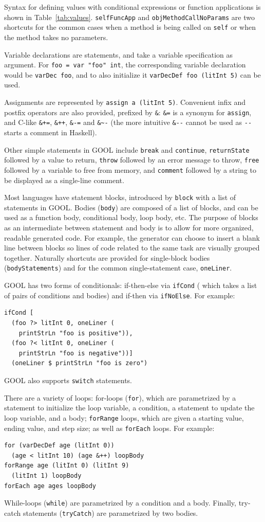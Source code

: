 \documentclass[sigplan,review,anonymous,prologue,dvipsnames]{acmart}
\begin{document}
Syntax for defining values with conditional expressions or function
applications is shown in Table~\ref{tab:values}. \verb|selfFuncApp| and
\verb|objMethodCallNoParams| are two shortcuts for the common cases when a
method is being called on \verb|self| or when the method takes no parameters.

Variable declarations are statements, and take a variable specification
as argument. For \verb|foo = var "foo" int|, the corresponding variable
declaration would be \verb|varDec foo|, and to also initialize it
\verb|varDecDef foo (litInt 5)| can be used.

Assignments are represented by \verb|assign a (litInt 5)|. Convenient
infix and postfix operators are also provided, prefixed by \verb|&|:
\verb|&=| is a synonym for \verb|assign|, and C-like
\verb|&+=|, \verb|&++|, \verb|&-=| and \verb|&~-| (the more intuitive
\verb|&--| cannot be used as \verb|--| starts a comment in Haskell).

Other simple statements in GOOL include \verb|break| and \verb|continue|,
\verb|returnState| followed by a value to return, \verb|throw| followed by an
error message to throw, \verb|free| followed by a variable to free from
memory, and \verb|comment| followed by a string to be displayed as a
single-line comment.

Most languages have statement blocks, introduced by \verb|block| with
a list of statements in GOOL. Bodies (\verb|body|) are composed
of a list of blocks, and can be used as a function body, conditional body, loop
body, etc. The purpose of blocks as an intermediate between statement and body
is to allow for more organized, readable generated code. For example, the
generator can choose to insert a blank line between blocks so lines of code
related to the same task are visually grouped together. Naturally shortcuts
are provided for single-block bodies (\verb|bodyStatements|) and
for the common single-statement case, \verb|oneLiner|.


GOOL has two forms of conditionals: if-then-else via \verb|ifCond| (
which takes a list of pairs of conditions and bodies) and
if-then via \verb|ifNoElse|.  For example:
\begin{lstlisting}
ifCond [
  (foo ?> litInt 0, oneLiner (
    printStrLn "foo is positive")),
  (foo ?< litInt 0, oneLiner (
    printStrLn "foo is negative"))]
  (oneLiner $ printStrLn "foo is zero")
\end{lstlisting}
GOOL also supports \verb|switch| statements.

There are a variety of loops: for-loops (\verb|for|), which are
parametrized by a statement to
initialize the loop variable, a condition, a statement to update the loop
variable, and a body; \verb|forRange| loops, which are given a
starting value, ending value, and step size; as well as \verb|forEach|
loops.
For example:
\begin{lstlisting}
for (varDecDef age (litInt 0))
  (age < litInt 10) (age &++) loopBody
forRange age (litInt 0) (litInt 9)
  (litInt 1) loopBody
forEach age ages loopBody
\end{lstlisting}
While-loops (\verb|while|) are parametrized by a condition and a body. Finally,
try-catch statements (\verb|tryCatch|) are parametrized by two bodies.
\end{document}
